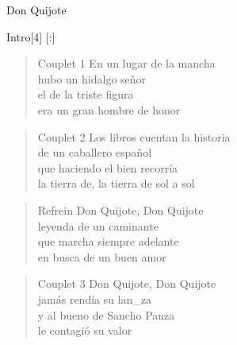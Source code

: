 \begin{song}{Don Quijote}

\begin{instrumental}{Intro}[4]
\measure{}\measure{}
\measure{}\measure{\hspace{4.25em}}[:]
\measure{}\measure*{}
\end{instrumental}

\begin{verse}{Couplet 1}
En un lugar de la mancha\\
hubo un hidalgo señor\\
el de la triste figura\\
era un gran hombre de honor\\
\end{verse}

\begin{verse}{Couplet 2}
Los libros cuentan la historia\\
de un caballero español\\
que haciendo el bien recorría\\
la tierra de, la tierra de sol a sol  \hspace{5em}\\
\end{verse}

\begin{verse}{Refrein}
Don Quijote, Don Quijote\\
leyenda de un caminante\\
que marcha siempre adelante\\
en busca de un buen a\chord{}mor\\
\end{verse}
\clearpage
\begin{verse}{Couplet 3}
Don Quijote, Don Quijote\\
jamás rendía su lan\_za\\
y al bueno de Sancho Panza\\
le contagió su valor
\end{verse}


\end{song}
